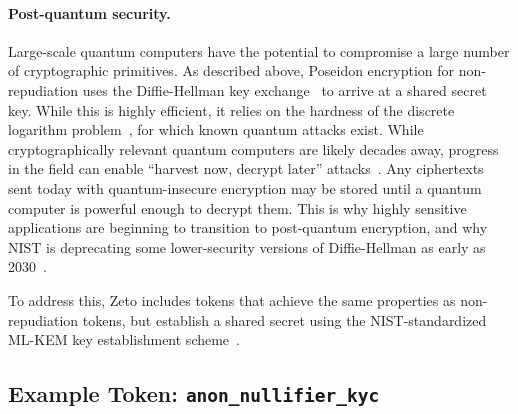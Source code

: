 \paragraph{Post-quantum security.} Large-scale quantum computers have the potential to compromise a large number of cryptographic primitives. As described above, Poseidon encryption for non-repudiation uses the Diffie-Hellman key exchange~\cite{TODO} to arrive at a shared secret key. While this is highly efficient, it relies on the hardness of the discrete logarithm problem~\cite{TODO}, for which known quantum attacks exist. While cryptographically relevant quantum computers are likely decades away, progress in the field can enable ``harvest now, decrypt later'' attacks~\cite{TODO}. Any ciphertexts sent today with quantum-insecure encryption may be stored until a quantum computer is powerful enough to decrypt them. This is why highly sensitive applications are beginning to transition to post-quantum encryption, and why NIST is deprecating some lower-security versions of Diffie-Hellman as early as 2030~\cite{TODO}.

To address this, Zeto includes tokens that achieve the same properties as non-repudiation tokens, but establish a shared secret using the NIST-standardized ML-KEM key establishment scheme~\cite{TODO}.





\subsection{Example Token: \texttt{anon\_nullifier\_kyc}} %

